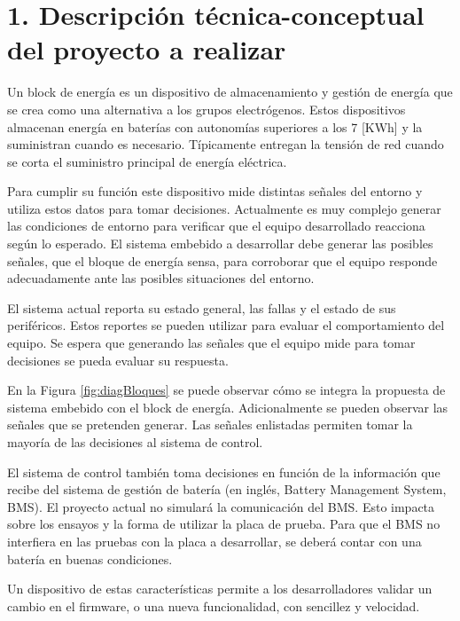 \documentclass[
11pt, %
codirector, %
]{charter}
\begin{document}
\section{1. Descripción técnica-conceptual del proyecto a realizar}
\label{sec:descripcion}


Un block de energía es un dispositivo de almacenamiento y gestión de energía que se crea como una alternativa a los grupos electrógenos. Estos dispositivos almacenan energía en baterías con autonomías superiores a los 7 [KWh] y la suministran cuando es necesario. Típicamente entregan la tensión de red cuando se corta el suministro principal de energía eléctrica.

Para cumplir su función este dispositivo mide distintas señales del entorno y utiliza estos datos para tomar decisiones. Actualmente es muy complejo generar las condiciones de entorno para verificar que el equipo desarrollado reacciona según lo esperado.
El sistema embebido a desarrollar debe generar las posibles señales, que el bloque de energía sensa, para corroborar que el equipo responde adecuadamente ante las posibles situaciones del entorno.

El sistema actual reporta su estado general, las fallas y el estado de sus periféricos. Estos reportes se pueden utilizar para evaluar el comportamiento del equipo. Se espera que generando las señales que el equipo mide para tomar decisiones se pueda evaluar su respuesta.

En la Figura \ref{fig:diagBloques} se puede observar cómo se integra la propuesta de sistema embebido con el block de energía. Adicionalmente se pueden observar las señales que se pretenden generar. Las señales enlistadas permiten tomar la mayoría de las decisiones al sistema de control.

El sistema de control también toma decisiones en función de la información que recibe del sistema de gestión de batería (en inglés, Battery Management System, BMS). El proyecto actual no simulará la comunicación del BMS. Esto impacta sobre los ensayos y la forma de utilizar la placa de prueba. Para que el BMS no interfiera en las pruebas con la placa a desarrollar, se deberá contar con una batería en buenas condiciones.

Un dispositivo de estas características permite a los desarrolladores validar un cambio en el firmware, o una nueva funcionalidad, con sencillez y velocidad.

\end{document}

